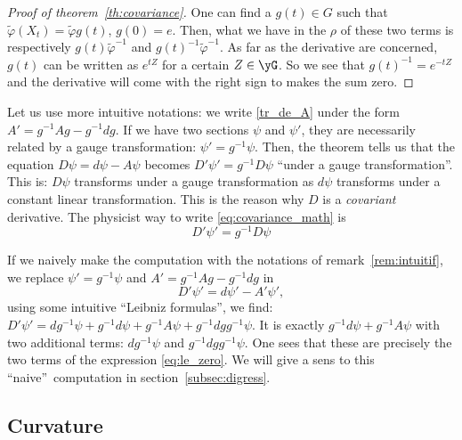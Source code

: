 \begin{proof}[Proof of theorem~\ref{th:covariance}]
	One can find a $g(t)\in G$ such that $\tilde{\varphi}(X_t)=\tilde{\varphi} g(t)$, $g(0)=e$. Then, what we have in the $\rho$ of these two terms is respectively $g(t)\tilde{\varphi}^{-1}$ and $g(t)^{-1}\tilde{\varphi}^{-1}$. As far as the derivative are concerned, $g(t)$ can be written as $e^{tZ}$ for a certain $Z\in\yG$. So we see that $g(t)^{-1}=e^{-tZ}$ and the derivative will come with the right sign to makes the sum zero.
\end{proof}

\begin{remark}
	Let us use more intuitive notations: we write \eqref{tr_de_A} under the form $A'=g^{-1} Ag-g^{-1} dg$. If we have two sections  $\psi$ and $\psi'$, they are necessarily related by a gauge transformation: $\psi'=g^{-1}\psi$. Then, the theorem tells us that the equation $D\psi=d\psi-A\psi$ becomes $D'\psi'=g^{-1} D\psi$ ``under a gauge transformation''. This is: $D\psi$ transforms under a gauge transformation as $d\psi$ transforms under a constant linear transformation. This is the reason why $D$ is a \emph{covariant} derivative. The physicist way to write \eqref{eq:covariance_math} is
	\begin{equation}\label{eq:covariance_phys}
		D'\psi'=g^{-1} D\psi
	\end{equation}
	\label{rem:intuitif}
\end{remark}

\begin{remark}
	If we naively make the computation with the notations of remark~\ref{rem:intuitif}, we replace $\psi'=g^{-1}\psi$ and $A'=g^{-1} Ag-g^{-1} dg$ in
	\[
		D'\psi'=d\psi'-A'\psi',
	\]
	using some intuitive ``Leibniz formulas'', we find:
	$D'\psi'=dg^{-1}\psi+g^{-1} d\psi+g^{-1} A\psi+g^{-1} dg g^{-1}\psi$. It is exactly $g^{-1} d\psi+g^{-1} A\psi$ with two additional terms: $dg^{-1}\psi$ and $g^{-1} dg g^{-1}\psi$. One sees that these are precisely the two terms of the expression \eqref{eq:le_zero}. We will give a sens to this ``naive''\ computation in section~\ref{subsec:digress}.
\end{remark}

\subsection{Curvature}

